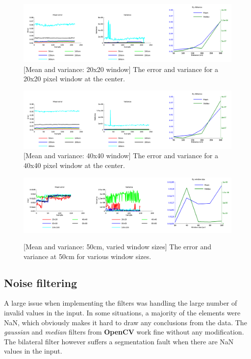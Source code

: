 \documentclass[11pt]{article}
\begin{document}
\begin{figure}[ht]
  \centering
  \includegraphics[width=1\textwidth]{figures/20x20-plot.png}
  [Mean and variance: 20x20 window]{\label{fig:20x20} The error and variance for a 20x20 pixel window at the center.}
\end{figure}
\begin{figure}[ht]
  \centering
  \includegraphics[width=1\textwidth]{figures/plot40x40.png}
  [Mean and variance: 40x40 window]{\label{fig:40x40} The error and variance for a 40x40 pixel window at the center.}
\end{figure}
\begin{figure}[ht]
  \centering
  \includegraphics[width=1\textwidth]{figures/plotwindowsizes.png}
  
  [Mean and variance: 50cm, varied window sizes]{\label{fig:variedwindow} The error and variance at 50cm for various window sizes.}
\end{figure}

\subsection{Noise filtering}

A large issue when implementing the filters was handling the large number of invalid values in the input. In some situations, a majority of the elements were NaN, which obviously makes it hard to draw any conclusions from the data. The \emph{gaussian} and \emph{median} filters from \textbf{OpenCV} work fine  without any modification. The bilateral filter however suffers a segmentation fault when there are NaN values in the input. \par
\end{document}
